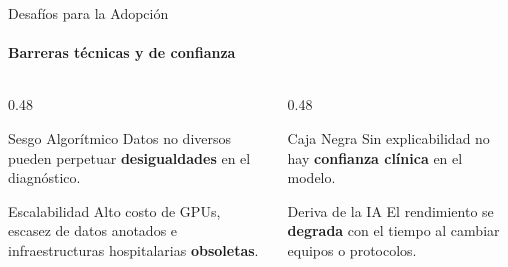 \begin{frame}{Desafíos para la Adopción}
\framesubtitle{Barreras técnicas y de confianza}

\begin{columns}[T]
\begin{column}{0.48\textwidth}
\begin{alertblock}{\faExclamationTriangle\; Sesgo Algorítmico}
Datos no diversos pueden perpetuar \textbf{desigualdades} en el diagnóstico.
\end{alertblock}
\vspace{3pt}
\begin{block}{\faServer\; Escalabilidad}
Alto costo de GPUs, escasez de datos anotados e infraestructuras hospitalarias \textbf{obsoletas}.
\end{block}
\end{column}
\begin{column}{0.48\textwidth}
\begin{alertblock}{\faLock\; Caja Negra}
Sin explicabilidad no hay \textbf{confianza clínica} en el modelo.
\end{alertblock}
\vspace{3pt}
\begin{block}{\faSync\; Deriva de la IA}
El rendimiento se \textbf{degrada} con el tiempo al cambiar equipos o protocolos.
\end{block}
\end{column}
\end{columns}

\end{frame}
